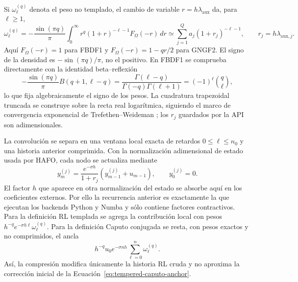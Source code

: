Si \(\omega_\ell^{(q)}\) denota el peso no templado, el cambio de variable
\(r=h\lambda_{\mathrm{aux}}\) da, para \(\ell\ge1\),
\begin{equation}
 \omega_\ell^{(q)}=
 -\frac{\sin(\pi q)}{\pi}
 \int_0^\infty r^q(1+r)^{-\ell-1}F_\Omega(-r)\,dr
 \simeq \sum_{j=1}^{Q}a_j(1+r_j)^{-\ell-1},
 \qquad r_j=h\lambda_{\mathrm{aux},j}.
 \label{eq:tempered-fast-real-axis}
\end{equation}
Aquí \(F_\Omega(-r)=1\) para FBDF1 y
\(F_\Omega(-r)=1-qr/2\) para GNGF2. El signo de la densidad es
\(-\sin(\pi q)/\pi\), no el positivo. En FBDF1 se comprueba directamente con
la identidad beta--reflexión
\[
 -\frac{\sin(\pi q)}{\pi}
 B(q+1,\ell-q)
 =\frac{\Gamma(\ell-q)}{\Gamma(-q)\Gamma(\ell+1)}
 =(-1)^\ell\binom q\ell,
\]
lo que fija algebraicamente el signo de los pesos. La cuadratura trapezoidal
truncada se construye sobre la recta real logarítmica, siguiendo el marco de
convergencia exponencial de Trefethen--Weideman
\cite{TrefethenWeideman2014}; los \(r_j\) guardados por la API son
adimensionales.

La convolución se separa en una ventana local exacta de retardos
\(0\le\ell\le n_0\) y una historia anterior comprimida. Con la normalización
adimensional de estado usada por HAFO, cada nodo se actualiza mediante
\begin{equation}
 y_m^{(j)}=\frac{e^{-\sigma h}}{1+r_j}
 \left(y_{m-1}^{(j)}+u_{m-1}\right),
 \qquad y_0^{(j)}=0.
 \label{eq:tempered-fast-recurrence}
\end{equation}
El factor \(h\) que aparece en otra normalización del estado se absorbe aquí
en los coeficientes externos. Por ello la recurrencia anterior es exactamente
la que ejecutan los backends Python y Numba y sólo contiene factores
contractivos. Para la definición RL templada se agrega la contribución local
con pesos \(h^{-q}e^{-\sigma h\ell}\omega_\ell^{(q)}\). Para la definición
Caputo conjugada se resta, con pesos exactos y no comprimidos, el ancla
\[
 h^{-q}u_0e^{-\sigma nh}\sum_{\ell=0}^{n}\omega_\ell^{(q)}.
\]
Así, la compresión modifica únicamente la historia RL cruda y no aproxima la
corrección inicial de la Ecuación~\eqref{eq:tempered-caputo-anchor}.

